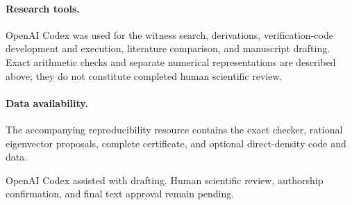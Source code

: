 \documentclass[aps,prb,reprint,amsmath,amssymb,longbibliography,floatfix]{revtex4-2}
\begin{document}
\paragraph{Research tools.}
OpenAI Codex was used for the witness search, derivations,
verification-code development and execution, literature comparison, and
manuscript drafting. Exact arithmetic checks and separate numerical
representations are described above; they do not constitute completed
human scientific review.

\paragraph{Data availability.}
The accompanying reproducibility resource contains the exact checker,
rational eigenvector proposals, complete certificate, and optional
direct-density code and data.

\begin{acknowledgments}
OpenAI Codex assisted with drafting. Human scientific review, authorship
confirmation, and final text approval remain pending.
\end{acknowledgments}


\end{document}

